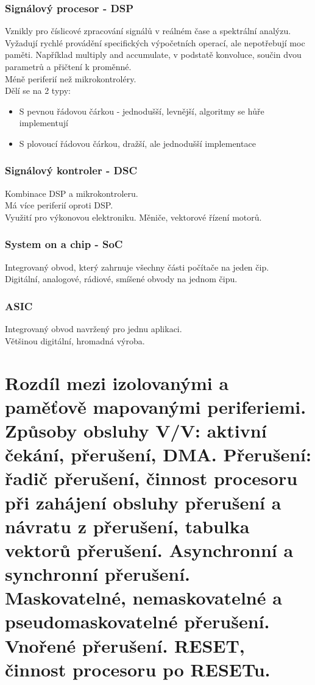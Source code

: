 \subsubsection*{Signálový procesor - DSP}
Vznikly pro číslicové zpracování signálů v reálném čase a spektrální analýzu. \\
Vyžadují rychlé provádění specifických výpočetních operací, ale nepotřebují moc paměti. Například multiply and accumulate, v podstatě konvoluce, součin dvou parametrů a přičtení k proměnné.\\
Méně periferií než mikrokontroléry. \\
Dělí se na 2 typy:
\begin{itemize}
    \item S pevnou řádovou čárkou - jednodušší, levnější, algoritmy se hůře implementují
    \item S plovoucí řádovou čárkou, dražší, ale jednodušší implementace
\end{itemize}

\subsubsection*{Signálový kontroler - DSC}
Kombinace DSP a mikrokontroleru.\\
Má více periferií oproti DSP. \\
Využití pro výkonovou elektroniku. Měniče, vektorové řízení motorů.\\

\subsubsection*{System on a chip - SoC}
Integrovaný obvod, který zahrnuje všechny části počítače na jeden čip. \\
Digitální, analogové, rádiové, smíšené obvody na jednom čipu. \\

\subsubsection*{ASIC}
Integrovaný obvod navržený pro jednu aplikaci.\\
Většinou digitální, hromadná výroba.\\

\section{Rozdíl mezi izolovanými a paměťově mapovanými periferiemi. Způsoby obsluhy V/V: aktivní čekání, přerušení, DMA.
  Přerušení: řadič přerušení, činnost procesoru při zahájení obsluhy přerušení a návratu z přerušení, tabulka vektorů přerušení. Asynchronní a synchronní přerušení. Maskovatelné, nemaskovatelné a pseudomaskovatelné přerušení. Vnořené přerušení. RESET, činnost procesoru po RESETu.}
